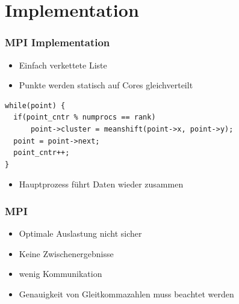 \documentclass[10pt,utf8]{beamer}
\begin{document}
\section{Implementation}
\begin{frame}[fragile]
	\frametitle{MPI Implementation}
	\begin{itemize}
		\item Einfach verkettete Liste
		\item Punkte werden statisch auf Cores gleichverteilt
	\end{itemize}
\normalsize
	\begin{lstlisting}
while(point) {
  if(point_cntr % numprocs == rank)
      point->cluster = meanshift(point->x, point->y);
  point = point->next;
  point_cntr++;
}
	\end{lstlisting}
\Large
	\begin{itemize}
		\item Hauptprozess führt Daten wieder zusammen
	\end{itemize}
\end{frame}
\begin{frame}
	\frametitle{MPI}
	\begin{itemize}
		\item Optimale Auslastung nicht sicher
		\item Keine Zwischenergebnisse
		\item wenig Kommunikation
		\item Genauigkeit von Gleitkommazahlen muss beachtet werden
	\end{itemize}
\end{frame}
\end{document}

